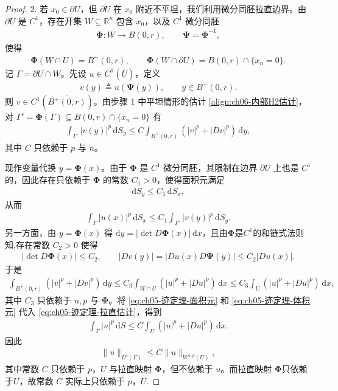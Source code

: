 \documentclass[../../main.tex]{subfiles}
\begin{document}
\begin{proof}
2. 若 $x_{0}\in\partial U$，但 $\partial U$ 在 $x_{0}$ 附近不平坦，我们利用微分同胚拉直边界。由 $\partial U$ 是 $C^{1}$，存在开集 $W\subseteq\mathbb{R}^{n}$ 包含 $x_{0}$，以及 $C^{1}$ 微分同胚
\begin{align*}
\boldsymbol{\Phi}: W \to B(0,r),\qquad \boldsymbol{\Psi}=\boldsymbol{\Phi}^{-1},
\end{align*}
使得
\begin{align*}
\boldsymbol{\Phi}(W\cap U)=B^{+}(0,r),\qquad
\boldsymbol{\Phi}(W\cap\partial U)=B(0,r)\cap\{x_{n}=0\}.
\end{align*}
记 $\Gamma=\partial U\cap W$。先设 $u\in C^{1}(\overline{U})$，定义
\begin{align*}
v(y)\triangleq u(\boldsymbol{\Psi}(y)),\qquad y\in B^{+}(0,r).
\end{align*}
则 $v\in C^{1}(\overline{B^{+}(0,r)})$。由步骤 1 中平坦情形的估计 \eqref{align:ch06-内部H2估计}，对 $\Gamma'=\boldsymbol{\Phi}(\Gamma)\subseteq B(0,r)\cap\{x_{n}=0\}$ 有
\begin{align}\label{eq:ch05-迹定理-拉直估计}
\int_{\Gamma'}|v(y)|^{p}\,\mathrm{d}S_{y}
\leqslant C\int_{B^{+}(0,r)}(|v|^{p}+|Dv|^{p})\,\mathrm{d}y,
\end{align}
其中 $C$ 只依赖于 $p$ 与 $n$。

现作变量代换 $y=\boldsymbol{\Phi}(x)$。由于 $\boldsymbol{\Phi}$ 是 $C^{1}$ 微分同胚，其限制在边界 $\partial U$ 上也是 $C^{1}$ 的，因此存在只依赖于 $\boldsymbol{\Phi}$ 的常数 $C_{1}>0$，使得面积元满足
\begin{align*}
\mathrm{d}S_{y}\leqslant C_{1}\,\mathrm{d}S_{x},
\end{align*}
从而
\begin{align}\label{eq:ch05-迹定理-面积元}
\int_{\Gamma}|u(x)|^{p}\,\mathrm{d}S_{x}
\leqslant C_{1}\int_{\Gamma'}|v(y)|^{p}\,\mathrm{d}S_{y}.
\end{align}
另一方面，由 $y=\boldsymbol{\Phi}(x)$ 得 $\mathrm{d}y=|\det D\boldsymbol{\Phi}(x)|\,\mathrm{d}x$，且由$\boldsymbol{\Phi}$是$C^1$的和链式法则知,存在常数 $C_{2}>0$ 使得
\begin{align*}
|\det D\boldsymbol{\Phi}(x)|\leqslant C_{2},\qquad
|Dv(y)|=|Du(x)D\boldsymbol{\Psi}(y)|\leqslant C_{2}|Du(x)|.
\end{align*}
于是
\begin{align}\label{eq:ch05-迹定理-体积元}
\int_{B^{+}(0,r)}(|v|^{p}+|Dv|^{p})\,\mathrm{d}y
\leqslant C_{3}\int_{W\cap U}(|u|^{p}+|Du|^{p})\,\mathrm{d}x
\leqslant C_{3}\int_{U}(|u|^{p}+|Du|^{p})\,\mathrm{d}x,
\end{align}
其中 $C_{3}$ 只依赖于 $n,p$ 与 $\boldsymbol{\Phi}$。将 \eqref{eq:ch05-迹定理-面积元} 和 \eqref{eq:ch05-迹定理-体积元} 代入 \eqref{eq:ch05-迹定理-拉直估计}，得到
\begin{align*}
\int_{\Gamma}|u|^{p}\,\mathrm{d}S
\leqslant C\int_{U}(|u|^{p}+|Du|^{p})\,\mathrm{d}x.
\end{align*}
因此
\begin{align*}
\|u\|_{L^{p}(\Gamma)}\leqslant C\|u\|_{W^{1,p}(U)},
\end{align*}
其中常数 $C$ 只依赖于 $p$，$U$ 与拉直映射 $\boldsymbol{\Phi}$，但不依赖于 $u$。而拉直映射 $\boldsymbol{\Phi}$只依赖于$U$，故常数 $C$ 实际上只依赖于 $p$，$U$.


\end{proof}
\end{document}
